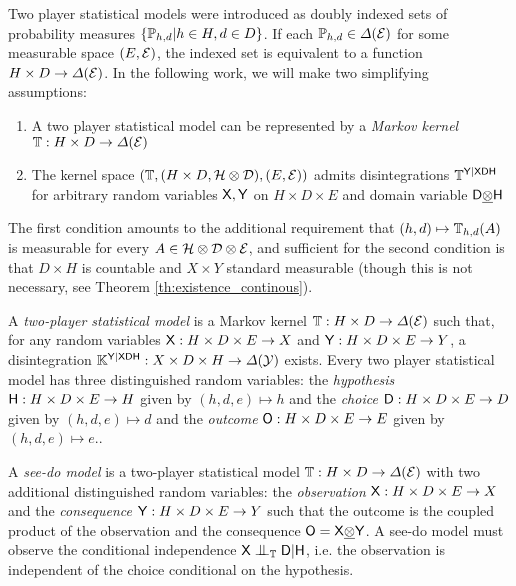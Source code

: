 Two player statistical models were introduced as doubly indexed sets of probability measures $\{\mathbb{P}_{h,d}|h\in H,d\in D\}$. If each $\mathbb{P}_{h,d}\in \Delta(\mathcal{E})$ for some measurable space $(E,\mathcal{E})$, the indexed set is equivalent to a function $H\times D\to \Delta(\mathcal{E})$. In the following work, we will make two simplifying assumptions:

\begin{enumerate}
    \item A two player statistical model can be represented by a \emph{Markov kernel} $\mathbb{T}:H\times D\to \Delta(\mathcal{E})$
    \item The kernel space $(\mathbb{T},(H\times D,\mathcal{H}\otimes\mathcal{D}),(E,\mathcal{E}))$ admits disintegrations $\mathbb{T}^{\mathsf{Y}|\mathsf{XDH}}$ for arbitrary random variables $\mathsf{X},\mathsf{Y}$ on $H\times D\times E$ and domain variable $\mathsf{D}\underline{\otimes}\mathsf{H}$
\end{enumerate}

The first condition amounts to the additional requirement that $(h,d)\mapsto \mathbb{T}_{h,d}(A)$ is measurable for every $A\in \mathcal{H}\otimes\mathcal{D}\otimes\mathcal{E}$, and sufficient for the second condition is that $D\times H$ is countable and $X\times Y$ standard measurable (though this is not necessary, see Theorem \ref{th:existence_continous}).

\begin{definition}\label{def:2p_stat}
A \emph{two-player statistical model} is a Markov kernel $\mathbb{T}:H\times D\to \Delta(\mathcal{E})$ such that, for any random variables $\mathsf{X}: H\times D\times E\to X$ and $\mathsf{Y}:H\times D\times E\to Y$, a disintegration $\mathbb{K}^{\mathsf{Y}|\mathsf{XDH}}:X\times D\times H\to \Delta(\mathcal{Y})$ exists. Every two player statistical model has three distinguished random variables: the \emph{hypothesis} $\mathsf{H}:H\times D\times E\to H$ given by $(h,d,e)\mapsto h$ and the \emph{choice} $\mathsf{D}:H\times D\times E\to D$ given by $(h,d,e)\mapsto d$ and the \emph{outcome} $\mathsf{O}:H\times D\times E\to E$ given by $(h,d,e)\mapsto e$..
\end{definition}

\begin{definition}\label{def:seedo}
A \emph{see-do model} is a two-player statistical model $\mathbb{T}:H\times D\to \Delta(\mathcal{E})$ with two additional distinguished random variables: the \emph{observation} $\mathsf{X}: H\times D\times E\to X$ and the \emph{consequence} $\mathsf{Y}:H\times D\times E\to Y$ such that the outcome is the coupled product of the observation and the consequence $\mathsf{O}=\mathsf{X}\underline{\otimes}\mathsf{Y}$. A see-do model must observe the conditional independence $\RV{X}\CI_\kernel{T} \RV{D}|\RV{H}$, i.e. the observation is independent of the choice conditional on the hypothesis.
\end{definition}

